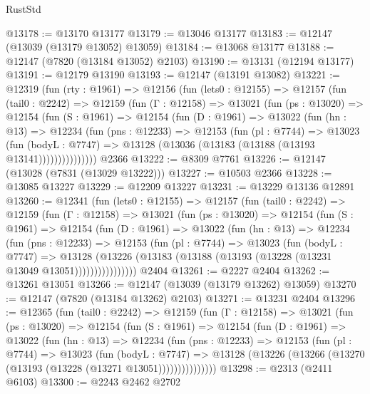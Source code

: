 \begin{lexlean}{RustStd}
\begin{coremodule}
@13178 := @13170 @13177
@13179 := @13046 @13177
@13183 := @12147 (@13039 (@13179 @13052) @13059)
@13184 := @13068 @13177
@13188 := @12147 (@7820 (@13184 @13052) @2103)
@13190 := @13131 (@12194 @13177)
@13191 := @12179 @13190
@13193 := @12147 (@13191 @13082)
@13221 := @12319
    (fun (rty : @1961) =>
    @12156
      (fun (lets0 : @12155) =>
      @12157
        (fun (tail0 : @2242) =>
        @12159
          (fun (Γ : @12158) =>
          @13021
            (fun (ps : @13020) =>
            @12154
              (fun (S : @1961) =>
              @12154
                (fun (D : @1961) =>
                @13022
                  (fun (hn : @13) =>
                  @12234
                    (fun (pns : @12233) =>
                    @12153
                      (fun (pl : @7744) =>
                      @13023
                        (fun (bodyL : @7747) =>
                        @13128 (@13036 (@13183 (@13188 (@13193 @13141)))))))))))))))
    @2366
@13222 := @8309 @7761
@13226 := @12147 (@13028 (@7831 (@13029 @13222)))
@13227 := @10503 @2366
@13228 := @13085 @13227
@13229 := @12209 @13227
@13231 := @13229 @13136 @12891
@13260 := @12341
    (fun (lets0 : @12155) =>
    @12157
      (fun (tail0 : @2242) =>
      @12159
        (fun (Γ : @12158) =>
        @13021
          (fun (ps : @13020) =>
          @12154
            (fun (S : @1961) =>
            @12154
              (fun (D : @1961) =>
              @13022
                (fun (hn : @13) =>
                @12234
                  (fun (pns : @12233) =>
                  @12153
                    (fun (pl : @7744) =>
                    @13023
                      (fun (bodyL : @7747) =>
                      @13128
                        (@13226
                          (@13183 (@13188 (@13193 (@13228 (@13231 @13049 @13051))))))))))))))))
    @2404
@13261 := @2227 @2404
@13262 := @13261 @13051
@13266 := @12147 (@13039 (@13179 @13262) @13059)
@13270 := @12147 (@7820 (@13184 @13262) @2103)
@13271 := @13231 @2404
@13296 := @12365
    (fun (tail0 : @2242) =>
    @12159
      (fun (Γ : @12158) =>
      @13021
        (fun (ps : @13020) =>
        @12154
          (fun (S : @1961) =>
          @12154
            (fun (D : @1961) =>
            @13022
              (fun (hn : @13) =>
              @12234
                (fun (pns : @12233) =>
                @12153
                  (fun (pl : @7744) =>
                  @13023
                    (fun (bodyL : @7747) =>
                    @13128 (@13226 (@13266 (@13270 (@13193 (@13228 (@13271 @13051)))))))))))))))
@13298 := @2313 (@2411 @6103)
@13300 := @2243 @2462 @2702

\end{coremodule}
\end{lexlean}
